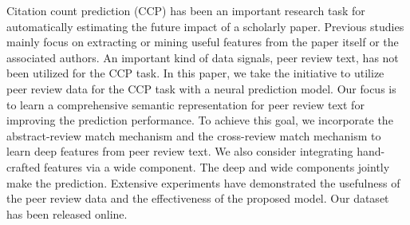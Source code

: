 Citation count prediction (CCP) has been an important research task for automatically estimating the future impact of a scholarly paper. Previous studies mainly focus on extracting or mining useful features from the paper itself or the associated authors. An important kind of data signals,  \ie peer review text, has not been utilized for the CCP task. In this paper, we take the initiative to utilize peer review data for the CCP task with a neural prediction model. Our focus is to learn a comprehensive  semantic representation for peer review text for improving the prediction performance. To achieve this goal, we incorporate the abstract-review match mechanism and the cross-review match mechanism to learn deep features from peer review text. We also consider integrating hand-crafted features via a wide component. The deep and wide components jointly make the prediction. Extensive experiments have demonstrated the usefulness of the peer review data and the effectiveness of the proposed model. Our dataset has been released online.